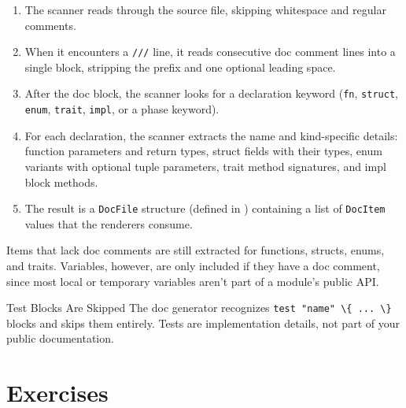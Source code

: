 \begin{enumerate}
  \item The scanner reads through the source file, skipping whitespace and regular comments.
  \item When it encounters a \lstinline|///| line, it reads consecutive doc comment lines into a single block, stripping the prefix and one optional leading space.
  \item After the doc block, the scanner looks for a declaration keyword (\lstinline|fn|, \lstinline|struct|, \lstinline|enum|, \lstinline|trait|, \lstinline|impl|, or a phase keyword).
  \item For each declaration, the scanner extracts the name and kind-specific details: function parameters and return types, struct fields with their types, enum variants with optional tuple parameters, trait method signatures, and impl block methods.
  \item The result is a \lstinline|DocFile| structure (defined in ) containing a list of \lstinline|DocItem| values that the renderers consume.
\end{enumerate}

Items that lack doc comments are still extracted for functions, structs, enums, and traits.
Variables, however, are only included if they have a doc comment, since most local or temporary variables aren't part of a module's public API.

\begin{notebox}{Test Blocks Are Skipped}
The doc generator recognizes \lstinline|test "name" \{ ... \}| blocks and skips them entirely.
Tests are implementation details, not part of your public documentation.
\end{notebox}

\section*{Exercises}\label{sec:formatter-docgen-exercises}

